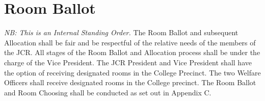 \chapter{Room Ballot}
\textit{NB: This is an Internal Standing Order.}
\npara The Room Ballot and subsequent Allocation shall be fair and be respectful of the relative needs of the members of the JCR.
\npara All stages of the Room Ballot and Allocation process shall be under the charge of the Vice President.
\npara The JCR President and Vice President shall have the option of receiving designated rooms in the College Precinct. The two Welfare Officers shall receive designated rooms in the College precinct.
\npara The Room Ballot and Room Choosing shall be conducted as set out in Appendix C.

